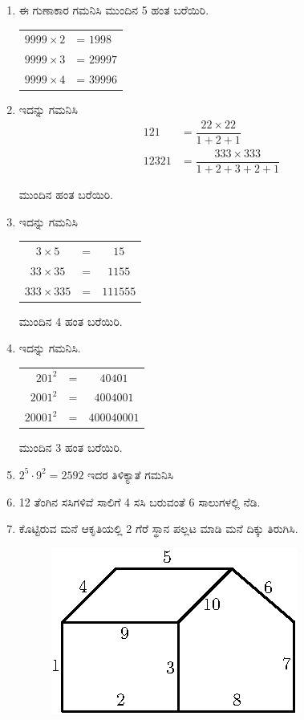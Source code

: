 \begin{enumerate}
\item ಈ ಗುಣಾಕಾರ ಗಮನಿಸಿ ಮುಂದಿನ 5 ಹಂತ ಬರೆಯಿರಿ. 

\begin{tabular}{ll}
$9999\times 2$ & = $1998$\\
$9999\times 3$ & = $29997$\\
$9999\times 4$ & = $39996$
\end{tabular} 

\item ಇದನ್ನು ಗಮನಿಸಿ 
\begin{align*}
121 & = \dfrac{22\times 22}{1 + 2 + 1}\\
12321 & = \dfrac{333 \times 333}{1 + 2 + 3 + 2 + 1}
\end{align*}  

ಮುಂದಿನ ಹಂತ ಬರೆಯಿರಿ. 

\item ಇದನ್ನು ಗಮನಿಸಿ 

\begin{tabular}{ccc}
$3\times 5$ & = & $15$\\
$33\times 35$ & = & $1155$\\
$333 \times 335$ & = & $111555$
\end{tabular}

ಮುಂದಿನ 4 ಹಂತ ಬರೆಯಿರಿ. 

\item ಇದನ್ನು ಗಮನಿಸಿ.

\begin{tabular}[[t]{rcc}
$201^{2}$ & = & $40401$\\
$2001^{2}$ & = & $4004001$\\
$20001^{2}$ & = & $400040001$
\end{tabular}

ಮುಂದಿನ 3 ಹಂತ ಬರೆಯಿರಿ. 

\item $2^{5} \cdot 9^{2} = 2592$ ಇದರ ತಿಳಿಕ್ಯಾತೆ ಗಮನಿಸಿ 

\item 12 ತೆಂಗಿನ ಸಸಿಗಳಿವೆ ಸಾಲಿಗೆ 4 ಸಸಿ ಬರುವಂತೆ 6 ಸಾಲುಗಳಲ್ಲಿ ನೆಡಿ. 

\item ಕೊಟ್ಟಿರುವ ಮನೆ ಆಕೃತಿಯಲ್ಲಿ 2 ಗೆರೆ ಸ್ಥಾನ ಪಲ್ಲಟ ಮಾಡಿ ಮನೆ ದಿಕ್ಕು ತಿರುಗಿಸಿ. 
\phantom{a}
\vskip -0.8cm
\begin{figure}[H]
\centering
\includegraphics{images/chap5/q19.eps}
\end{figure}


\end{enumerate}
